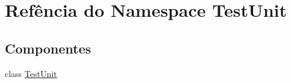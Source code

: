 \hypertarget{namespaceTestUnit}{\section{Refência do Namespace Test\-Unit}
\label{d0/de8/namespaceTestUnit}
}
\subsection*{Componentes}
\begin{DoxyCompactItemize}
\item 
class \hyperlink{classTestUnit_1_1TestUnit}{Test\-Unit}
\end{DoxyCompactItemize}
